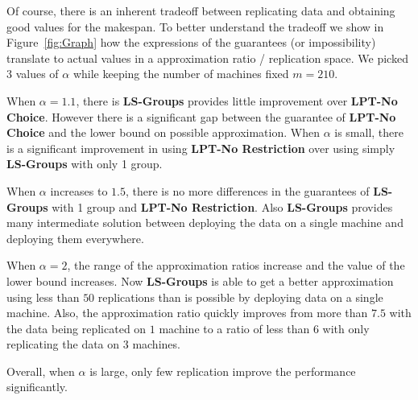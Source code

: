 \documentclass[10pt, conference, compsocconf]{IEEEtran}
\begin{document}
Of course, there is an inherent tradeoff between replicating data and
obtaining good values for the makespan. To better understand the
tradeoff we show in Figure~\ref{fig:Graph} how the expressions of the
guarantees (or impossibility) translate to actual values in a
approximation ratio / replication space.  We picked 3 values of
$\alpha$ while keeping the number of machines fixed $m=210$. 

When $\alpha=1.1$, there is {\bf LS-Groups} provides little
improvement over {\bf LPT-No Choice}. However there is a significant
gap between the guarantee of {\bf LPT-No Choice} and the lower bound
on possible approximation. When $\alpha$ is small, there is a
significant improvement in using {\bf LPT-No Restriction} over using
simply {\bf LS-Groups} with only 1 group.

When $\alpha$ increases to $1.5$, there is no more differences in the
guarantees of {\bf LS-Groups} with 1 group and {\bf LPT-No
  Restriction}. Also {\bf LS-Groups} provides many intermediate
solution between deploying the data on a single machine and deploying
them everywhere.

When $\alpha=2$, the range of the approximation ratios increase and
the value of the lower bound increases. Now {\bf LS-Groups} is able to
get a better approximation using less than $50$ replications than is
possible by deploying data on a single machine. Also, the
approximation ratio quickly improves from more than $7.5$ with the
data being replicated on $1$ machine to a ratio of less than $6$ with
only replicating the data on $3$ machines.

Overall, when $\alpha$ is large, only few replication improve the
performance significantly.
\end{document}
